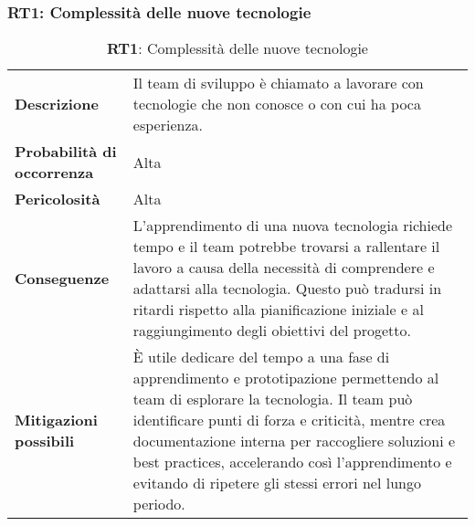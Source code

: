 \subsubsection{RT1: Complessità delle nuove tecnologie}
\label{sec:Complessità delle nuove tecnologie}
\begin{table}[h!]
    \centering
    \renewcommand{\arraystretch}{1.5} %
    \begin{tabularx}{\textwidth}{|X|X|}\hline
    \rowcolor[HTML]{FFD700} 
    \multicolumn{2}{|c|}{\textbf{Complessità delle nuove tecnologie}} \\ \hline
    \textbf{Descrizione} & Il team di sviluppo è chiamato a lavorare con tecnologie che non conosce o con cui ha poca esperienza. \\ \hline
    \textbf{Probabilità di occorrenza} & Alta \\ \hline
    \textbf{Pericolosità} & Alta \\ \hline
    \textbf{Conseguenze} &  L'apprendimento di una nuova tecnologia richiede tempo e il team potrebbe trovarsi a rallentare il lavoro a causa della necessità di comprendere e adattarsi alla tecnologia. 
    Questo può tradursi in ritardi rispetto alla pianificazione iniziale e al raggiungimento degli obiettivi del progetto. \\ \hline
    \textbf{Mitigazioni possibili} & È utile dedicare del tempo a una fase di apprendimento e prototipazione permettendo al team di esplorare la tecnologia. Il team può identificare punti di forza e criticità, mentre crea documentazione interna per raccogliere soluzioni e best practices, 
    accelerando così l'apprendimento e evitando di ripetere gli stessi errori nel lungo periodo. \\ \hline
    \end{tabularx}
    \caption{\textbf{RT1}: Complessità delle nuove tecnologie}
    \end{table}

\newpage

